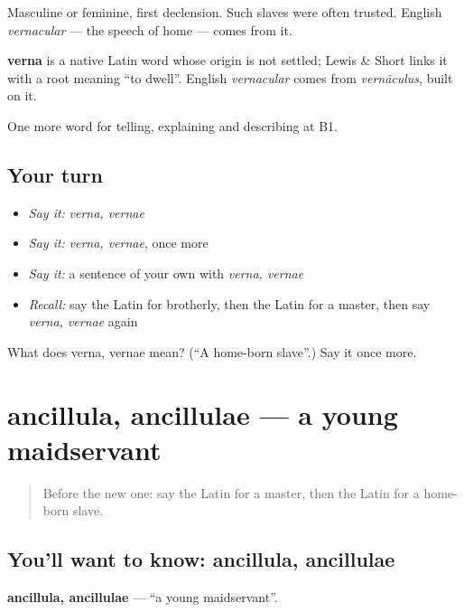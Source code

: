 Masculine or feminine, first declension. Such slaves were often trusted. English \emph{vernacular} — the speech of home — comes from it.

\begin{cousinweb}
\textbf{verna} is a native Latin word whose origin is not settled; Lewis \& Short links it with a root meaning \textquotedblleft{}to dwell\textquotedblright{}. English \emph{vernacular} comes from \emph{vernāculus}, built on it.
\end{cousinweb}

\begin{grammarlens}[title={What you've built}]
One more word for telling, explaining and describing at B1.
\end{grammarlens}

\subsection*{Your turn}
\begin{itemize}
\raggedright
  \item \emph{Say it:} \emph{verna, vernae}
  \item \emph{Say it:} \emph{verna, vernae}, once more
  \item \emph{Say it:} a sentence of your own with \emph{verna, vernae}
  \item \emph{Recall:} say the Latin for brotherly, then the Latin for a master, then say \emph{verna, vernae} again
\end{itemize}

\begin{tcolorbox}[breakable,colback=teal!4,colframe=teal!35!black,title={Before you move on}]
What does verna, vernae mean? (\textquotedblleft{}A home-born slave\textquotedblright{}.) Say it once more.
\end{tcolorbox}
\section[ancillula, ancillulae]{ancillula, ancillulae — a young maidservant}

\label{lesson:LA-C530-ancillula}



\begin{quote}
Before the new one: say the Latin for a master, then the Latin for a home-born slave.
\end{quote}

\subsection*{You'll want to know: ancillula, ancillulae}
\textbf{ancillula, ancillulae} — \textquotedblleft{}a young maidservant\textquotedblright{}.

